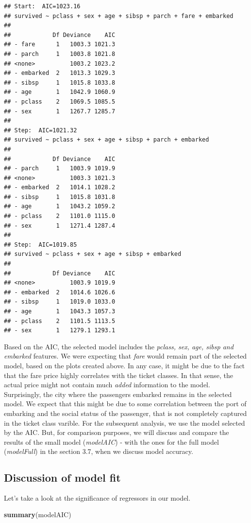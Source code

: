 \documentclass[12,]{article}
\newenvironment{Shaded}{\begin{snugshade}}{\end{snugshade}}
\newcommand{\KeywordTok}[1]{\textcolor[rgb]{0.13,0.29,0.53}{\textbf{#1}}}
\newcommand{\NormalTok}[1]{#1}
\begin{document}
\begin{verbatim}
## Start:  AIC=1023.16
## survived ~ pclass + sex + age + sibsp + parch + fare + embarked
## 
##            Df Deviance    AIC
## - fare      1   1003.3 1021.3
## - parch     1   1003.8 1021.8
## <none>          1003.2 1023.2
## - embarked  2   1013.3 1029.3
## - sibsp     1   1015.8 1033.8
## - age       1   1042.9 1060.9
## - pclass    2   1069.5 1085.5
## - sex       1   1267.7 1285.7
## 
## Step:  AIC=1021.32
## survived ~ pclass + sex + age + sibsp + parch + embarked
## 
##            Df Deviance    AIC
## - parch     1   1003.9 1019.9
## <none>          1003.3 1021.3
## - embarked  2   1014.1 1028.2
## - sibsp     1   1015.8 1031.8
## - age       1   1043.2 1059.2
## - pclass    2   1101.0 1115.0
## - sex       1   1271.4 1287.4
## 
## Step:  AIC=1019.85
## survived ~ pclass + sex + age + sibsp + embarked
## 
##            Df Deviance    AIC
## <none>          1003.9 1019.9
## - embarked  2   1014.6 1026.6
## - sibsp     1   1019.0 1033.0
## - age       1   1043.3 1057.3
## - pclass    2   1101.5 1113.5
## - sex       1   1279.1 1293.1
\end{verbatim}

Based on the AIC, the selected model includes the \emph{pclass, sex,
age, sibsp and embarked} features. We were expecting that \emph{fare}
would remain part of the selected model, based on the plots created
above. In any case, it might be due to the fact that the fare price
highly correlates with the ticket classes. In that sense, the actual
price might not contain much \emph{added} information to the model.
Surprisingly, the city where the passengers embarked remains in the
selected model. We expect that this might be due to some correlation
between the port of embarking and the social status of the passenger,
that is not completely captured in the ticket class varible. For the
subsequent analysis, we use the model selected by the AIC. But, for
comparison purposes, we will discuss and compare the results of the
small model (\emph{modelAIC}) - with the ones for the full model
(\emph{modelFull}) in the section 3.7, when we discuss model accuracy.

\subsection{Discussion of model fit}\label{discussion-of-model-fit}

Let's take a look at the significance of regressors in our model.

\begin{Shaded}
\begin{Highlighting}[]
\KeywordTok{summary}\NormalTok{(modelAIC)}
\end{Highlighting}
\end{Shaded}
\end{document}

